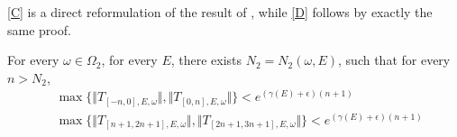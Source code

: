 \begin{remark}
  \eqref{C} is a direct reformulation of the result of \cite{craig1983subharmonicity}, while \eqref{D} follows by exactly the same proof.
\end{remark}
\begin{cor}\label{omega2}
  For every $ \omega\in\Omega_2$, for every $E$, there exists $N_2=N_2(\omega,E)$, such that for every $ n>N_2$,
\[
\begin{aligned}
&\max\{\Vert T_{[-n,0],E,\omega}\Vert, \Vert T_{[0,n],E,\omega}\Vert\}<e^{(\gamma(E)+\epsilon)(n+1)}\\ &\max\{\Vert T_{[n+1,2n+1],E,\omega}\Vert, \Vert T_{[2n+1,3n+1],E,\omega}\Vert\}<e^{(\gamma(E)+\epsilon)(n+1)}
\end{aligned}
\]

\end{cor}
